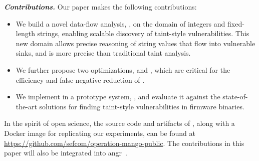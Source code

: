 \smallskip
\noindent
\textbf{\textit{Contributions.}}
Our paper makes the following contributions:

\begin{itemize}[noitemsep]
    \item
          We build a novel data-flow analysis, \rda, on the domain of integers and fixed-length strings, enabling scalable discovery of taint-style vulnerabilities.
          This new domain allows precise reasoning of string values that flow into vulnerable sinks, and is more precise than traditional taint analysis.

    \item
          We further propose two optimizations, \rev and \assumed, which are critical for the efficiency and false negative reduction of \rda.

    \item
          We implement \rda in a prototype system, \mango, and evaluate it against the state-of-the-art solutions for finding taint-style vulnerabilities in firmware binaries.


\end{itemize}

\smallskip
\noindent
In the spirit of open science, the source code and artifacts of \mango, along with a Docker image for replicating our experiments, can be found at \url{https://github.com/sefcom/operation-mango-public}.
The contributions in this paper will also be integrated into angr~\cite{wang2017angr}.
